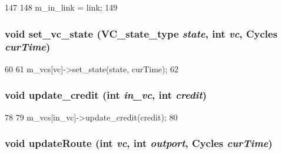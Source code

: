 \begin{DoxyCode}
147     {
148         m_in_link = link;
149     }
\end{DoxyCode}
\hypertarget{classInputUnit__d_a67dafbe49b665179990b2bdadfc133c9}{
\subsubsection[{set\_\-vc\_\-state}]{\setlength{\rightskip}{0pt plus 5cm}void set\_\-vc\_\-state ({\bf VC\_\-state\_\-type} {\em state}, \/  int {\em vc}, \/  {\bf Cycles} {\em curTime})}}
\label{classInputUnit__d_a67dafbe49b665179990b2bdadfc133c9}



\begin{DoxyCode}
60     {
61         m_vcs[vc]->set_state(state, curTime);
62     }
\end{DoxyCode}
\hypertarget{classInputUnit__d_aee6ae59a64822a6f5b32ee88a8e26217}{
\subsubsection[{update\_\-credit}]{\setlength{\rightskip}{0pt plus 5cm}void update\_\-credit (int {\em in\_\-vc}, \/  int {\em credit})}}
\label{classInputUnit__d_aee6ae59a64822a6f5b32ee88a8e26217}



\begin{DoxyCode}
78     {
79         m_vcs[in_vc]->update_credit(credit);
80     }
\end{DoxyCode}
\hypertarget{classInputUnit__d_ab2f58089dd6bd314ce6dae4298a6f190}{
\subsubsection[{updateRoute}]{\setlength{\rightskip}{0pt plus 5cm}void updateRoute (int {\em vc}, \/  int {\em outport}, \/  {\bf Cycles} {\em curTime})}}
\label{classInputUnit__d_ab2f58089dd6bd314ce6dae4298a6f190}



